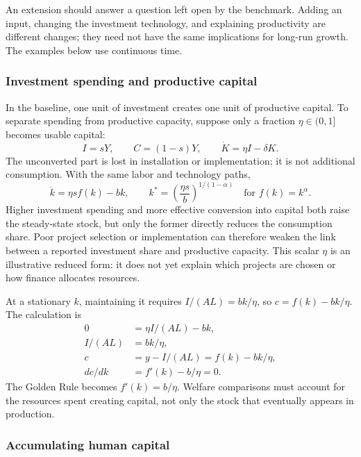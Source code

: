 An extension should answer a question left open by the benchmark. Adding an
input, changing the investment technology, and explaining productivity are
different changes; they need not have the same implications for long-run growth.
The examples below use continuous time.

\subsubsection{Investment spending and productive capital}

In the baseline, one unit of investment creates one unit of productive capital.
To separate spending from productive capacity, suppose only a fraction
$\eta\in(0,1]$ becomes usable capital:
\begin{equation}
I=sY,\qquad C=(1-s)Y,\qquad \dot K=\eta I-\delta K.
\end{equation}
The unconverted part is lost in installation or implementation; it is not
additional consumption. With the same labor and technology paths,
\begin{equation}
\dot k=\eta sf(k)-bk,\qquad
k^*=\left(\frac{\eta s}{b}\right)^{1/(1-\alpha)}
\quad\text{for }f(k)=k^\alpha.
\end{equation}
Higher investment spending and more effective conversion into capital both
raise the steady-state stock, but only the former directly reduces the
consumption share. Poor project selection or implementation can therefore
weaken the link between a reported investment share and productive capacity.
This scalar $\eta$ is an illustrative reduced form: it does not yet explain
which projects are chosen or how finance allocates resources.

At a stationary $k$, maintaining it requires $I/(AL)=bk/\eta$, so
$c=f(k)-bk/\eta$. The calculation is
\begin{align}
0&=\eta I/(AL)-bk,\\
I/(AL)&=bk/\eta,\\
c&=y-I/(AL)=f(k)-bk/\eta,\\
dc/dk&=f'(k)-b/\eta=0.
\end{align}
The Golden Rule becomes $f'(k)=b/\eta$. Welfare comparisons
must account for the resources spent creating capital, not only the stock
that eventually appears in production.

\subsubsection{Accumulating human capital}

